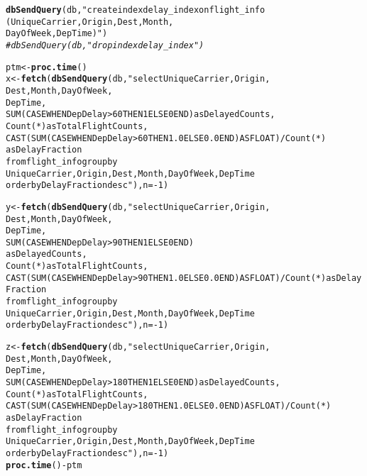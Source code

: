 \documentclass{article}\usepackage[]{graphicx}\usepackage[]{color}
\makeatletter
\newcommand{\hlnum}[1]{\textcolor[rgb]{0.686,0.059,0.569}{#1}}%
\newcommand{\hlstr}[1]{\textcolor[rgb]{0.192,0.494,0.8}{#1}}%
\newcommand{\hlcom}[1]{\textcolor[rgb]{0.678,0.584,0.686}{\textit{#1}}}%
\newcommand{\hlopt}[1]{\textcolor[rgb]{0,0,0}{#1}}%
\newcommand{\hlstd}[1]{\textcolor[rgb]{0.345,0.345,0.345}{#1}}%
\newcommand{\hlkwb}[1]{\textcolor[rgb]{0.69,0.353,0.396}{#1}}%
\newcommand{\hlkwc}[1]{\textcolor[rgb]{0.333,0.667,0.333}{#1}}%
\newcommand{\hlkwd}[1]{\textcolor[rgb]{0.737,0.353,0.396}{\textbf{#1}}}%
\newenvironment{kframe}{%
 \def\at@end@of@kframe{}%
 \ifinner\ifhmode%
  \def\at@end@of@kframe{\end{minipage}}%
  \begin{minipage}{\columnwidth}%
 \fi\fi%
 \def\FrameCommand##1{\hskip\@totalleftmargin \hskip-\fboxsep
 \colorbox{shadecolor}{##1}\hskip-\fboxsep
     \hskip-\linewidth \hskip-\@totalleftmargin \hskip\columnwidth}%
 \MakeFramed {\advance\hsize-\width
   \@totalleftmargin\z@ \linewidth\hsize
   \@setminipage}}%
 {\par\unskip\endMakeFramed%
 \at@end@of@kframe}
\newenvironment{knitrout}{}{} %
\makeatother
\begin{document}
\begin{knitrout}
\color{fgcolor}\begin{kframe}
\begin{alltt}
\hlkwd{dbSendQuery}\hlstd{(db,} \hlstr{"create index delay_index on flight_info
            (UniqueCarrier, Origin, Dest, Month, 
            DayOfWeek, DepTime)"}\hlstd{)}
\hlcom{# dbSendQuery(db, "drop index delay_index")}

\hlstd{ptm} \hlkwb{<-} \hlkwd{proc.time}\hlstd{()}
\hlstd{x} \hlkwb{<-} \hlkwd{fetch}\hlstd{(}\hlkwd{dbSendQuery}\hlstd{(db,} \hlstr{"select UniqueCarrier, Origin, 
                       Dest, Month, DayOfWeek, 
                       DepTime,
                       SUM(CASE WHEN DepDelay > 60 THEN 1 ELSE 0 END) as DelayedCounts, 
                       Count(*) as TotalFlightCounts,
                       CAST(SUM(CASE WHEN DepDelay > 60 THEN 1.0 ELSE 0.0 END) AS FLOAT) / Count(*) 
                       as DelayFraction
                       from flight_info group by
                       UniqueCarrier, Origin, Dest, Month, DayOfWeek, DepTime
                       order by DelayFraction desc"}\hlstd{),}\hlkwc{n}\hlstd{=}\hlopt{-}\hlnum{1}\hlstd{)}

\hlstd{y} \hlkwb{<-} \hlkwd{fetch}\hlstd{(}\hlkwd{dbSendQuery}\hlstd{(db,} \hlstr{"select UniqueCarrier, Origin, 
                       Dest, Month, DayOfWeek, 
                       DepTime,
                       SUM(CASE WHEN DepDelay > 90 THEN 1 ELSE 0 END) 
                       as DelayedCounts, 
                       Count(*) as TotalFlightCounts,
                       CAST(SUM(CASE WHEN DepDelay > 90 THEN 1.0 ELSE 0.0 END) AS FLOAT) / Count(*) as DelayFraction
                       from flight_info group by
                       UniqueCarrier, Origin, Dest, Month, DayOfWeek, DepTime
                       order by DelayFraction desc"}\hlstd{),}\hlkwc{n}\hlstd{=}\hlopt{-}\hlnum{1}\hlstd{)}

\hlstd{z} \hlkwb{<-} \hlkwd{fetch}\hlstd{(}\hlkwd{dbSendQuery}\hlstd{(db,} \hlstr{"select UniqueCarrier, Origin, 
                       Dest, Month, DayOfWeek, 
                       DepTime,
                       SUM(CASE WHEN DepDelay > 180 THEN 1 ELSE 0 END) as DelayedCounts, 
                       Count(*) as TotalFlightCounts,
                       CAST(SUM(CASE WHEN DepDelay > 180 THEN 1.0 ELSE 0.0 END) AS FLOAT) / Count(*) 
                       as DelayFraction
                       from flight_info group by
                       UniqueCarrier, Origin, Dest, Month, DayOfWeek, DepTime
                       order by DelayFraction desc"}\hlstd{),}\hlkwc{n}\hlstd{=}\hlopt{-}\hlnum{1}\hlstd{)}
\hlkwd{proc.time}\hlstd{()} \hlopt{-} \hlstd{ptm}
\end{alltt}
\end{kframe}
\end{knitrout}
\end{document}
